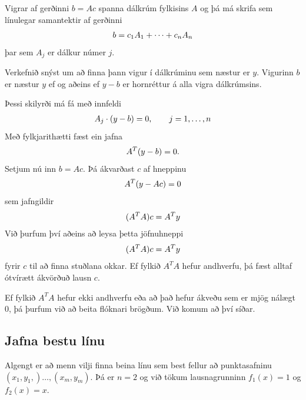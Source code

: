 \documentclass[letterpaper,10pt,icelandic]{sphinxmanual}
\begin{document}
Vigrar af gerðinni \(b= Ac\) spanna dálkrúm fylkisins \(A\) og
þá má skrifa sem línulegar samantektir af gerðinni
\begin{gather}
\begin{split}b = c_1A_1 + \cdots + c_nA_n\end{split}\notag
\end{gather}
þar sem \(A_j\) er dálkur númer \(j\).

Verkefnið snýst um að finna þann vigur í dálkrúminu sem næstur er
\(y\). Vigurinn \(b\) er næstur \(y\) ef og aðeins ef
\(y-b\) er hornréttur á alla vigra dálkrúmsins.

Þessi skilyrði má fá með innfeldi
\begin{gather}
\begin{split}A_j \cdot (y-b) = 0, \qquad j = 1, \ldots , n\end{split}\notag
\end{gather}
Með fylkjarithætti fæst ein jafna
\begin{gather}
\begin{split}A^T (y-b) = 0.\end{split}\notag
\end{gather}
Setjum nú inn \(b=Ac\). Þá ákvarðast \(c\) af hneppinu
\begin{gather}
\begin{split}A^T(y-Ac) = 0\end{split}\notag
\end{gather}
sem jafngildir
\begin{gather}
\begin{split}(A^TA)c = A^Ty\end{split}\notag
\end{gather}
Við þurfum því aðeins að leysa þetta jöfnuhneppi
\begin{gather}
\begin{split}(A^TA)c = A^Ty\end{split}\notag
\end{gather}
fyrir \(c\) til að finna stuðlana okkar. Ef fylkið \(A^TA\)
hefur andhverfu, þá fæst alltaf ótvírætt ákvörðuð lausn \(c\).

Ef fylkið \(A^TA\) hefur ekki andhverfu eða að það hefur ákveðu sem
er mjög nálægt \(0\), þá þurfum við að beita flóknari brögðum. Við
komum að því síðar.


\subsection{Jafna bestu línu}
\label{kafli03:index-25}\label{kafli03:id11}
Algengt er að menn vilji finna beina línu sem best fellur að
punktasafninu \((x_1,y_1,)\dots,(x_m,y_m)\). Þá er \(n=2\) og
við tökum lausnagrunninn \(f_1(x)=1\) og \(f_2(x)=x\).
\end{document}
